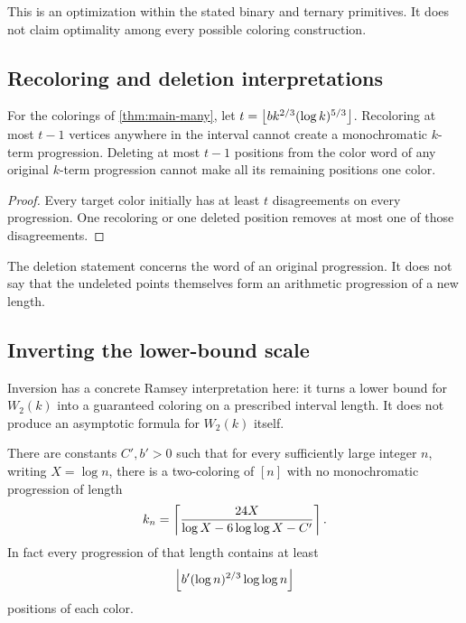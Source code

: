 This is an optimization within the stated binary and ternary
primitives. It does not claim optimality among every possible
coloring construction.

\subsection{Recoloring and deletion interpretations}

\begin{corollary}\label{cor:edits}
For the colorings of \cref{thm:main-many}, let
\(t=\left\lfloor b k^{2/3}(\log k)^{5/3}\right\rfloor\).
Recoloring at most \(t-1\) vertices anywhere in the interval cannot
create a monochromatic \(k\)-term progression.
Deleting at most \(t-1\) positions from the color word of any original
\(k\)-term progression cannot make all its remaining positions one
color.
\end{corollary}

\begin{proof}
Every target color initially has at least \(t\) disagreements on every
progression. One recoloring or one deleted position removes at most
one of those disagreements.
\end{proof}

The deletion statement concerns the word of an original progression.
It does not say that the undeleted points themselves form an arithmetic
progression of a new length.

\subsection{Inverting the lower-bound scale}

Inversion has a concrete Ramsey interpretation here: it turns a
lower bound for \(W_2(k)\) into a guaranteed coloring on a prescribed
interval length. It does not produce an asymptotic formula for
\(W_2(k)\) itself.

\begin{corollary}\label{cor:inverse}
There are constants \(C',b'>0\) such that for every sufficiently
large integer \(n\), writing \(X=\log n\), there is a two-coloring
of \([n]\) with no monochromatic progression of length
\begin{equation}\label{eq:inverse-explicit}
 k_n=
 \left\lceil \frac{24X}
 {\log X-6\log\log X-C'}\right\rceil .
\end{equation}
In fact every progression of that length contains at least
\[
 \left\lfloor b'(\log n)^{2/3}\log\log n\right\rfloor
\]
positions of each color.
\end{corollary}

